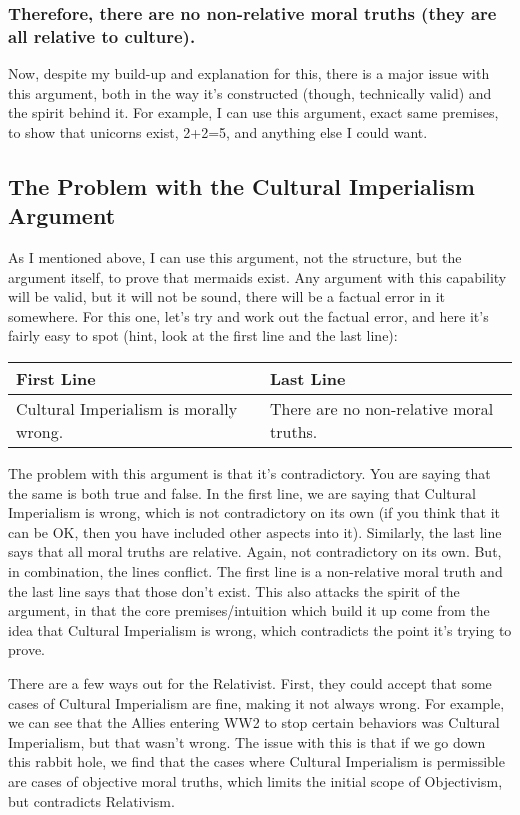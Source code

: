 \subsubsection{Therefore, there are no non-relative moral truths (they are all relative to culture).}
Now, despite my build-up and explanation for this, there is a major issue with this argument, both in the way it's constructed (though, technically valid) and the spirit behind it. For example, I can use this argument, exact same premises, to show that unicorns exist, 2+2=5, and anything else I could want. 

\subsection{The Problem with the Cultural Imperialism Argument}

As I mentioned above, I can use this argument, not the structure, but the argument itself, to prove that mermaids exist. Any argument with this capability will be valid, but it will not be sound, there will be a factual error in it somewhere. For this one, let's try and work out the factual error, and here it's fairly easy to spot (hint, look at the first line and the last line):


\noindent
\begin{tabular}{p{2.75in}|p{2.75in}}
First Line&Last Line\\\hline
Cultural Imperialism is morally wrong.&There are no non-relative moral truths.
\end{tabular}

The problem with this argument is that it's contradictory. You are saying that the same is both true and false. In the first line, we are saying that Cultural Imperialism is wrong, which is not contradictory on its own (if you think that it can be OK, then you have included other aspects into it). Similarly, the last line says that all moral truths are relative. Again, not contradictory on its own. But, in combination, the lines conflict. The first line is a non-relative moral truth and the last line says that those don't exist. This also attacks the spirit of the argument, in that the core premises/intuition which build it up come from the idea that Cultural Imperialism is wrong, which contradicts the point it's trying to prove. 

There are a few ways out for the Relativist. First, they could accept that some cases of Cultural Imperialism are fine, making it not always wrong. For example, we can see that the Allies entering WW2 to stop certain behaviors was Cultural Imperialism, but that wasn't wrong. The issue with this is that if we go down this rabbit hole, we find that the cases where Cultural Imperialism is permissible are cases of objective moral truths, which limits the initial scope of Objectivism, but contradicts Relativism. 

